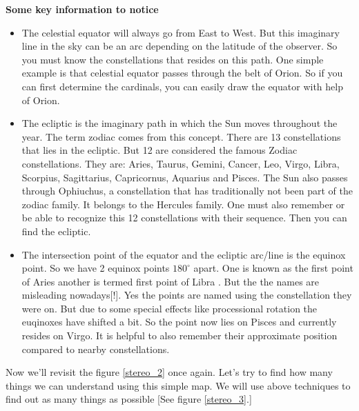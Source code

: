 \documentclass[a4paper,12pt]{extarticle}
\begin{document}
\textbf{Some key information to notice}
\begin{itemize}
    \item The celestial equator will always go from East to West. But this imaginary line in the sky can be an arc depending on the latitude of the observer. So you must know the constellations that resides on this path. One simple example is that celestial equator passes through the belt of Orion. So if you can first determine the cardinals, you can easily draw the equator with help of Orion.
    \item The ecliptic is the imaginary path in which the Sun moves throughout the year. The term zodiac comes from this concept. There are 13 constellations that lies in the ecliptic. But 12 are considered the famous Zodiac constellations. They are: Aries, Taurus, Gemini, Cancer, Leo, Virgo, Libra, Scorpius, Sagittarius, Capricornus, Aquarius and Pisces. The Sun also passes through Ophiuchus, a constellation that has traditionally not been part of the zodiac family. It belongs to the Hercules family. One must also remember or be able to recognize this 12 constellations with their sequence. Then you can find the ecliptic.
    \item The intersection point of the equator and the ecliptic arc/line is the equinox point. So we have 2 equinox points $180^\circ$ apart. One is known as the first point of Aries \aries \; another is termed first point of Libra \libra. But the the names are misleading nowadays[!]. Yes the points are named using the constellation they were on. But due to some special effects like processional rotation the euqinoxes have shifted a bit. So the \aries \; point now lies on Pisces and \libra \; currently resides on Virgo. It is helpful to also remember their approximate position compared to nearby constellations.
\end{itemize}

Now we'll revisit the figure \ref{stereo_2} once again. Let's try to find how many things we can understand using this simple map. We will use above techniques to find out as many things as possible [See figure \ref{stereo_3}.]
\end{document}
